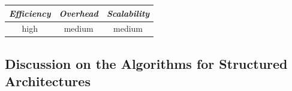 \begin{center}
{\footnotesize
\begin{tabular}{ccc}
\emph{Efficiency} & \emph{Overhead} & \emph{Scalability} \\
\hline
high &
medium &
medium
\end{tabular}
}
\end{center}

\subsection{Discussion on the Algorithms for Structured Architectures}

